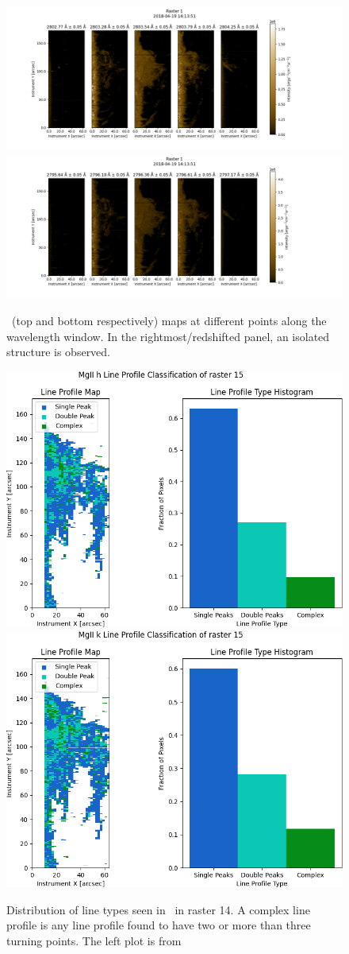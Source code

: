 \begin{figure}
    \centering
    \includegraphics[width=0.9\linewidth]{01Observations/figs/20180419/spectrogramh1.png}
    \includegraphics[width=0.9\linewidth]{01Observations/figs/20180419/spectrogramk1.png}
    \caption[\mgiihk{} maps at different points along the wavelength window. In the rightmost/redshift panel, an isolated structure is observed.]{\mgiihk\ (top and bottom respectively) maps at different points along the wavelength window. In the rightmost/redshifted panel, an isolated structure is observed.}
    \label{fig:extraboi}
    \includegraphics[width=.47\linewidth]{./01Observations/figs/20180419/h14lt.png}
    \includegraphics[width=.47\linewidth]{./01Observations/figs/20180419/k14lt.png}
    \caption[Distribution of line types seen in \mgiihk\ in raster 14.]{Distribution of line types seen in \mgiihk\ in raster 14. A complex line profile is any line profile found to have two or more than three turning points. The left plot is from \cite{peat_solar_2021}}
    \label{linetypes}
\end{figure}

